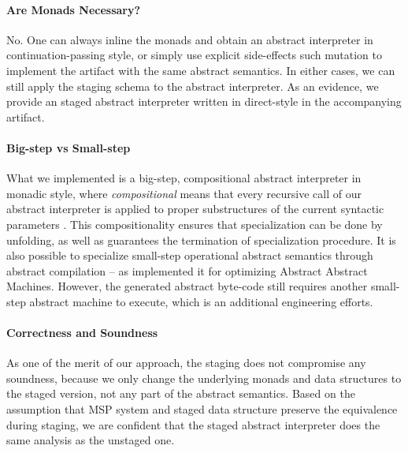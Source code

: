 \paragraph{Are Monads Necessary?} No. One can always inline the monads and
obtain an abstract interpreter in continuation-passing style, or simply use
explicit side-effects such mutation to implement the artifact with the same
abstract semantics. In either cases, we can still apply the staging schema to
the abstract interpreter. As an evidence, we provide an staged abstract
interpreter written in direct-style in the accompanying artifact.

\paragraph{Big-step vs Small-step}

What we implemented is a big-step, compositional abstract interpreter in monadic
style, where \textit{compositional} means that every recursive call of our abstract
interpreter is applied to proper substructures of the current syntactic
parameters \cite{10.1007/3-540-61580-6_11}. This compositionality ensures that
specialization can be done by unfolding, as well as guarantees the termination
of specialization procedure. It is also possible to specialize small-step
operational abstract semantics through abstract compilation
\cite{Boucher:1996:ACN:647473.727587} -- as
\citet{Johnson:2013:OAA:2500365.2500604} implemented it for
optimizing Abstract Abstract Machines. However, the generated abstract
byte-code still requires another small-step abstract machine to execute, which is
an additional engineering efforts.

\paragraph{Correctness and Soundness}

As one of the merit of our approach, the staging does not compromise any
soundness, because we only change the underlying monads and data structures to
the staged version, not any part of the abstract semantics. Based on the
assumption that MSP system and staged data structure preserve the equivalence
during staging, we are confident that the staged abstract interpreter does the
same analysis as the unstaged one.

